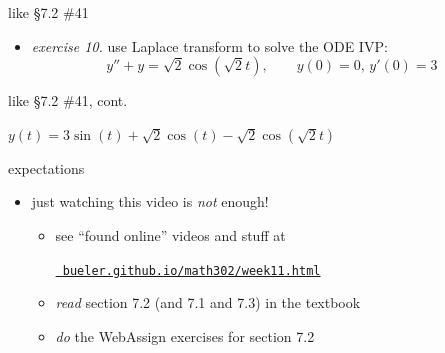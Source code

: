 \documentclass[urlcolor=blue,dvipsnames]{beamer}
\begin{document}
\begin{frame}{like \S7.2 \#41}

\begin{itemize}
\item \emph{exercise 10.}  use Laplace transform to solve the ODE IVP:
    $$y''+y=\sqrt{2} \cos(\sqrt{2} t), \qquad y(0)=0, \, y'(0)=3$$

\vspace{50mm}
\end{itemize}
\end{frame}


\begin{frame}{like \S7.2 \#41, cont.}


\vspace{60mm}
\hfill $y(t) = 3 \sin(t) + \sqrt{2} \cos(t) - \sqrt{2}\cos(\sqrt{2} t)$
\end{frame}


\begin{frame}{expectations}

\begin{itemize}
\item just watching this video is \emph{not} enough!
     \begin{itemize}
     \item see ``found online'' videos and stuff at

     \centerline{\href{https://bueler.github.io/math302/week11.html}{\tt \color{cyan} bueler.github.io/math302/week11.html}}
     \item \emph{read} section 7.2 (and 7.1 and 7.3) in the textbook
     \item \emph{do} the WebAssign exercises for section 7.2
     \end{itemize}
\end{itemize}
\end{frame}
\end{document}
